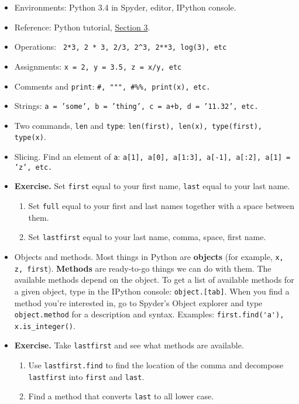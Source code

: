 \documentclass[11pt]{article}
\begin{document}
\begin{itemize}
\item Environments:  Python 3.4 in Spyder, editor, IPython console.
\item Reference:
{Python tutorial},
\href{https://docs.python.org/3.4/tutorial/introduction.html}{Section 3}.

\item Operations:  \verb: 2*3, 2 * 3, 2/3, 2^3, 2**3, log(3), etc :

\item Assignments:  {\tt x = 2, y = 3.5, z = x/y, etc }
\item Comments and {\tt print}:  \verb:#, """, #%%, print(x), etc. :
\item Strings:  {\tt a = 'some', b = 'thing', c = a+b, d = '11.32', etc.}

\item Two commands,  {\tt len} and {\tt type}:
{\tt len(first), len(x), type(first), type(x)}.

\item Slicing.  Find an element of {\tt a}: {\tt a[1], a[0], a[1:3], a[-1], a[:2], a[1] = 'z', etc.}

\item {\bf Exercise.}  Set {\tt first} equal to your first name, {\tt last} equal to your last name.
\begin{enumerate}[label=(\alph*)]
\item Set {\tt full} equal to your first and last names together with a space between them.
\item Set {\tt lastfirst} equal to your last name, comma, space, first name.
\end{enumerate}

\item Objects and methods.  
Most things in Python are {\bf objects}
(for example, {\tt x, z, first}).
{\bf Methods} are ready-to-go things we can do with them.
The available methods depend on the object.
To get a list of available methods for a given object,
type in the IPython console: {\tt object.[tab]}.
When you find a method you're interested in, 
go to Spyder's Object explorer
and type {\tt object.method} for a description and syntax.
Examples:  \verb:first.find('a'), x.is_integer():.

\item {\bf Exercise.}  Take {\tt lastfirst} and see what methods are available.
\begin{enumerate}[label=(\alph*)]
\item Use {\tt lastfirst.find} to find the location of the comma and
decompose {\tt lastfirst} into {\tt first} and {\tt last}.
\item Find a method that converts {\tt last} to all lower case.
\end{enumerate}


\end{itemize}
\end{document}
